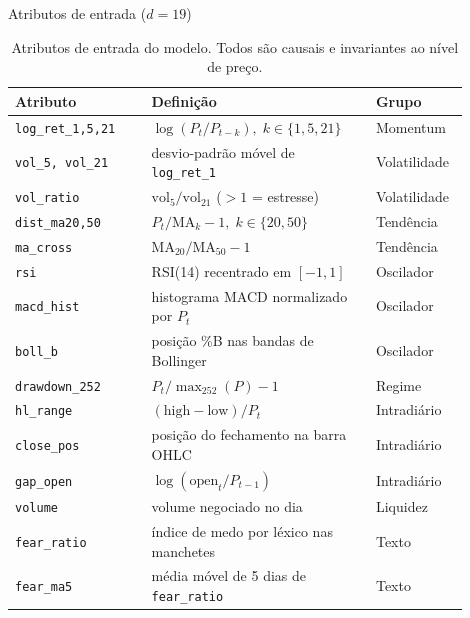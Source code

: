 \documentclass{libs/ufc_format}
\begin{document}
{\logo{}
\begin{frame}{Atributos de entrada ($d=19$)}
    \scriptsize
    \begin{table}
    \centering
    \caption{Atributos de entrada do modelo. Todos são causais e invariantes ao nível de preço.}
    \begin{tabular}{p{0.28\linewidth} p{0.46\linewidth} p{0.16\linewidth}}
        \toprule
        \textbf{Atributo} & \textbf{Definição} & \textbf{Grupo} \\
        \midrule
        \texttt{log\_ret\_1,5,21} & $\log(P_t/P_{t-k}),\; k\in\{1,5,21\}$ & Momentum \\
        \texttt{vol\_5, vol\_21} & desvio-padrão móvel de \texttt{log\_ret\_1} & Volatilidade \\
        \texttt{vol\_ratio} & $\mathrm{vol}_5/\mathrm{vol}_{21}$ ($>1$ = estresse) & Volatilidade \\
        \texttt{dist\_ma20,50} & $P_t/\mathrm{MA}_k - 1,\; k\in\{20,50\}$ & Tendência \\
        \texttt{ma\_cross} & $\mathrm{MA}_{20}/\mathrm{MA}_{50} - 1$ & Tendência \\
        \texttt{rsi} & RSI(14) recentrado em $[-1,1]$ & Oscilador \\
        \texttt{macd\_hist} & histograma MACD normalizado por $P_t$ & Oscilador \\
        \texttt{boll\_b} & posição \%B nas bandas de Bollinger & Oscilador \\
        \texttt{drawdown\_252} & $P_t/\max_{252}(P) - 1$ & Regime \\
        \texttt{hl\_range} & $(\mathrm{high}-\mathrm{low})/P_t$ & Intradiário \\
        \texttt{close\_pos} & posição do fechamento na barra OHLC & Intradiário \\
        \texttt{gap\_open} & $\log(\mathrm{open}_t/P_{t-1})$ & Intradiário \\
        \texttt{volume} & volume negociado no dia & Liquidez \\
        \texttt{fear\_ratio} & índice de medo por léxico nas manchetes & Texto \\
        \texttt{fear\_ma5} & média móvel de 5 dias de \texttt{fear\_ratio} & Texto \\
        \bottomrule
    \end{tabular}
    \end{table}

    \vspace{0.2cm}
\end{frame}
}
\end{document}
